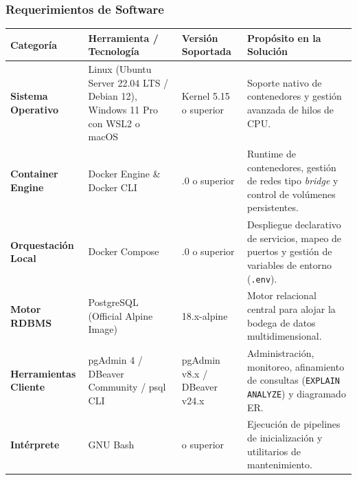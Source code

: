\begin{landscape}
	\vfill %
	
	\subsubsection{Requerimientos de Software}
	
	\begingroup
	\label{tab:software_req}
	\addtocounter{table}{-1}
	\begin{tabularx}{\linewidth}{>{\raggedright\arraybackslash\hsize=0.7\hsize}X >{\raggedright\arraybackslash\hsize=1.2\hsize}X >{\raggedright\arraybackslash\hsize=0.7\hsize}X >{\raggedright\arraybackslash\hsize=1.4\hsize}X}
		\toprule
		\textbf{Categoría} & \textbf{Herramienta / Tecnología} & \textbf{Versión Soportada} & \textbf{Propósito en la Solución} \\
		\midrule
		\textbf{Sistema Operativo} & Linux (Ubuntu Server 22.04 LTS / Debian 12), Windows 11 Pro con WSL2 o macOS & Kernel 5.15 o superior & Soporte nativo de contenedores y gestión avanzada de hilos de CPU. \\
		\addlinespace
		\textbf{Container Engine} & Docker Engine \& Docker CLI & 24.0.0 o superior & Runtime de contenedores, gestión de redes tipo \textit{bridge} y control de volúmenes persistentes. \\
		\addlinespace
		\textbf{Orquestación Local} & Docker Compose & 2.20.0 o superior & Despliegue declarativo de servicios, mapeo de puertos y gestión de variables de entorno (\texttt{.env}). \\
		\addlinespace
		\textbf{Motor RDBMS} & PostgreSQL (Official Alpine Image) & 18.x-alpine & Motor relacional central para alojar la bodega de datos multidimensional. \\
		\addlinespace
		\textbf{Herramientas Cliente} & pgAdmin 4 / DBeaver Community / psql CLI & pgAdmin v8.x / DBeaver v24.x & Administración, monitoreo, afinamiento de consultas (\texttt{EXPLAIN ANALYZE}) y diagramado ER. \\
		\addlinespace
		\textbf{Intérprete} & GNU Bash & 5.0 o superior & Ejecución de pipelines de inicialización y utilitarios de mantenimiento. \\
		\bottomrule
	\end{tabularx}
	\endgroup
	
\end{landscape}